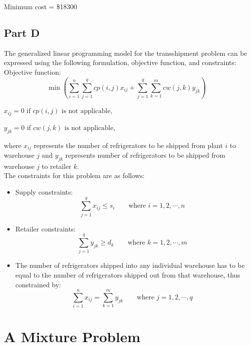 \documentclass[11pt]{scrreprt}
\begin{document}
Minimum cost = \$18300

\section{Part D}
The generalized linear programming model for the transshipment problem 
can be expressed using the following formulation, objective function,
and constraints:\\

Objective function:
\begin{displaymath}
\min \left(\sum_{i=1}^{n} \sum_{j=1}^{q} cp(i,j)x_{ij} + \sum_{j=1}^{q} \sum_{k=1}^{m} cw(j,k)y_{jk}\right)
\end{displaymath}

$x_{ij}=0 \textrm{ if } cp(i,j) \textrm{ is not applicable, }$

$y_{jk}=0 \textrm{ if } cw(j,k) \textrm{ is not applicable,}$

where $x_{ij}$ represents the number of refrigerators to be shipped 
from plant $i$ to warehouse $j$ and $y_{jk}$ represents number of 
refrigerators to be shipped from warehouse $j$ to retailer $k$.\\

The constraints for this problem are as follows:

\begin{itemize}
	\item Supply constraints:
	\begin{displaymath}
	\sum_{j=1}^{q} x_{ij} \leq s_i 
	\qquad\textrm{where } i=1,2,\cdots,n
	\end{displaymath}
	\item Retailer constraints:
	\begin{displaymath}
	\sum_{j=1}^{q} y_{jk} \geq d_k 
	\qquad\textrm{where } k=1,2,\cdots,m
	\end{displaymath}
	\item The number of refrigerators shipped into any individual 
	warehouse has to be equal to the number of refrigerators 
	shipped out from that warehouse, thus constrained by:
	\begin{displaymath}
	\sum_{i=1}^{n} x_{ij} = \sum_{k=1}^{m} y_{jk} 
	\qquad\textrm{where } j=1,2,\cdots,q
	\end{displaymath}
\end{itemize}




\chapter{A Mixture Problem}
\end{document}

